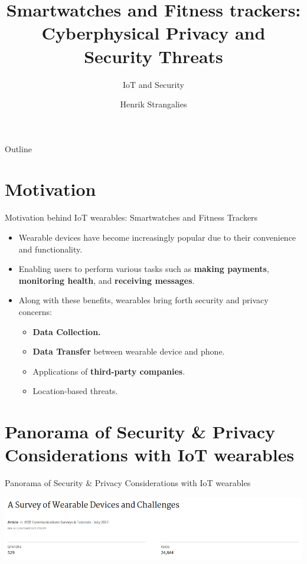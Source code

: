 \documentclass[ucs,9pt]{beamer}
\title[Privacy and Security Threats of IoT Wearables] %
{Smartwatches and Fitness trackers: Cyberphysical Privacy and Security Threats}
\subtitle
{IoT and Security}
\author[Author, Another] %
{Henrik Strangalies} %
\institute[Computer Science] %
{Freie Universität Berlin}
\begin{document}
\begin{frame}[plain]
  \titlepage
\end{frame}

\begin{frame}{Outline}
  \tableofcontents
\end{frame}

\section{Motivation}



\begin{frame}{Motivation behind IoT wearables: Smartwatches and Fitness Trackers}
  \begin{itemize}
  \item Wearable devices have become increasingly popular
   due to their convenience and functionality.
  \item Enabling users to perform various tasks such as \textbf{making payments}, \textbf{monitoring health}, and \textbf{receiving messages}.
  
  \pause 
  
  \item  Along with these benefits, wearables bring forth security and privacy concerns:
  \begin{itemize}
	\item \textbf{Data Collection.}
	\item \textbf{Data Transfer} between wearable device and phone.
	\item Applications of \textbf{third-party companies}.
	\item Location-based threats.
  \end{itemize}
  \end{itemize}
\end{frame}


\section{Panorama of Security \& Privacy Considerations with IoT wearables}

\begin{frame}[fragile]{Panorama of Security \& Privacy Considerations with IoT wearables}

\includegraphics[width=1\linewidth]{imgs/ASurveyofWearableDevicesandChallenges}

\end{frame}
\end{document}
